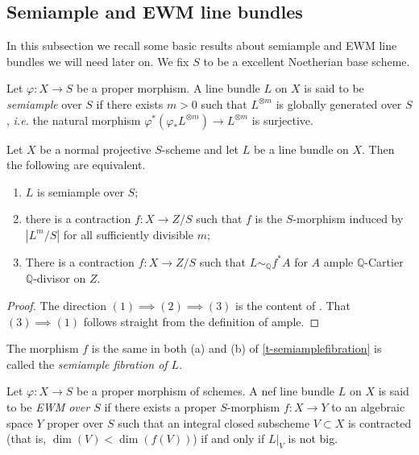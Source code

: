 	\subsection{Semiample and EWM line bundles}
	
	In this subsection we recall some basic results about semiample and EWM line bundles we will need later on. We fix $S$ to be a excellent Noetherian base scheme.
	
	\begin{definition}
		Let $\varphi \colon X \to S$ be a proper morphism. A line bundle $L$ on $X$ is said to be \textit{semiample} over $S$ if there exists $m>0$ such that $L^{\otimes m}$ is globally generated over $S$, \emph{i.e.} the natural morphism $\varphi^*(\varphi_*L^{\otimes m}) \to L^{\otimes m}$ is surjective.
	\end{definition} 
	
	\begin{theorem}\label{t-semiamplefibration}
		Let $X$ be a normal projective $S$-scheme and let $L$ be a line bundle on $X$. Then the following are equivalent.
		\begin{enumerate}
			\item $L$ is semiample over $S$;
			\item there is a contraction 
			$f\colon X\to Z/S$
			such that $f$ is the $S$-morphism induced by $|L^m/S|$ for all sufficiently divisible $m$;
			\item There is a contraction 
			$f\colon X\to Z/S$
			such that $L\sim_{\mathbb{Q}} f^{*}A$ for $A$ ample $\mathbb{Q}$-Cartier $\mathbb{Q}$-divisor on $Z$.
		\end{enumerate}
	\end{theorem}
	
	\begin{proof}
		The direction $(1) \implies (2) \implies (3)$ is the content of \cite[Theorem 2.1.26]{La1}. That $(3) \implies (1)$ follows straight from the definition of ample.
	\end{proof}
	
	The morphism $f$ is the same in both (a) and (b) of \autoref{t-semiamplefibration} is called the \textit{semiample fibration of $L$}.	
	
	\begin{definition}
	Let $\varphi \colon X \to S$ be a proper morphism of schemes. 
	A nef line bundle $L$ on $X$ is said to be \emph{EWM over $S$} if there exists a proper $S$-morphism $f \colon X \rightarrow Y$ to an algebraic space $Y$ proper over $S$ such that an integral closed subscheme $V \subset X$ is contracted (that is, $\dim(V) < \dim (f(V))$) if and only if $L|_V$ is not big. 
	\end{definition}
	
